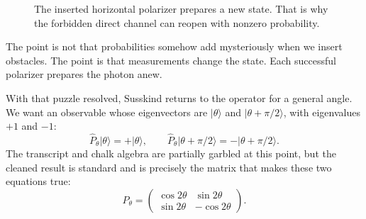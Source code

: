 \begin{figure}
\centering
{}
\caption{The inserted horizontal polarizer prepares a new state. That is why the forbidden direct channel can reopen with nonzero probability.}
\end{figure}

The point is not that probabilities somehow add mysteriously when we insert obstacles. The point is that measurements change the state. Each successful polarizer prepares the photon anew.

With that puzzle resolved, Susskind returns to the operator for a general angle. We want an observable whose eigenvectors are \(|\theta\rangle\) and \(|\theta+\pi/2\rangle\), with eigenvalues \(+1\) and \(-1\):
\begin{equation}
\hat P_\theta|\theta\rangle=+|\theta\rangle,
\qquad
\hat P_\theta|\theta+\pi/2\rangle=-|\theta+\pi/2\rangle.
\end{equation}
The transcript and chalk algebra are partially garbled at this point, but the cleaned result is standard and is precisely the matrix that makes these two equations true:
\begin{equation}
P_\theta=
\begin{pmatrix}
\cos 2\theta & \sin 2\theta\\
\sin 2\theta & -\cos 2\theta
\end{pmatrix}.
\end{equation}

